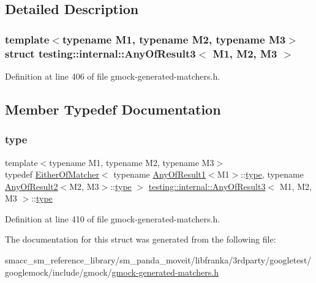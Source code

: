 \subsection{Detailed Description}
\subsubsection*{template$<$typename M1, typename M2, typename M3$>$\newline
struct testing\+::internal\+::\+Any\+Of\+Result3$<$ M1, M2, M3 $>$}



Definition at line 406 of file gmock-\/generated-\/matchers.\+h.



\subsection{Member Typedef Documentation}
\mbox{\label{structtesting_1_1internal_1_1AnyOfResult3_a232b20553cc0a33a6741e85e19ef4b0c}} 
\subsubsection{\texorpdfstring{type}{type}}
{\footnotesize\ttfamily template$<$typename M1, typename M2, typename M3$>$ \\
typedef \hyperlink{classtesting_1_1internal_1_1EitherOfMatcher}{Either\+Of\+Matcher}$<$ typename \hyperlink{structtesting_1_1internal_1_1AnyOfResult1}{Any\+Of\+Result1}$<$M1$>$\+::\hyperlink{structtesting_1_1internal_1_1AnyOfResult3_a232b20553cc0a33a6741e85e19ef4b0c}{type}, typename \hyperlink{structtesting_1_1internal_1_1AnyOfResult2}{Any\+Of\+Result2}$<$M2, M3$>$\+::\hyperlink{structtesting_1_1internal_1_1AnyOfResult3_a232b20553cc0a33a6741e85e19ef4b0c}{type} $>$ \hyperlink{structtesting_1_1internal_1_1AnyOfResult3}{testing\+::internal\+::\+Any\+Of\+Result3}$<$ M1, M2, M3 $>$\+::\hyperlink{structtesting_1_1internal_1_1AnyOfResult3_a232b20553cc0a33a6741e85e19ef4b0c}{type}}



Definition at line 410 of file gmock-\/generated-\/matchers.\+h.



The documentation for this struct was generated from the following file\+:\begin{DoxyCompactItemize}
\item 
smacc\+\_\+sm\+\_\+reference\+\_\+library/sm\+\_\+panda\+\_\+moveit/libfranka/3rdparty/googletest/googlemock/include/gmock/\hyperlink{gmock-generated-matchers_8h}{gmock-\/generated-\/matchers.\+h}\end{DoxyCompactItemize}
